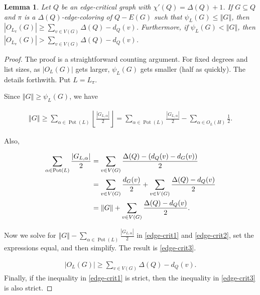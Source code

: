\documentclass[12pt,reqno]{amsart}
\theoremstyle{plain}
\newtheorem{lem}[thm]{Lemma}
\theoremstyle{definition}
\theoremstyle{remark}
\newcommand{\card}[1]{\left|#1\right|}
\newcommand{\size}[1]{\left\Vert#1\right\Vert}
\newcommand{\floor}[1]{\left\lfloor#1\right\rfloor}
\newcommand{\pot}{\operatorname{Pot}}
\begin{document}
\begin{lem}\label{LowPsiGivesManyOddColors}
Let $Q$ be an edge-critical graph with $\chi'(Q) = \Delta(Q) + 1$. If $G
\subseteq Q$ and $\pi$ is a $\Delta(Q)$-edge-coloring of $Q - E(G)$ such that
$\psi_L(G) \le \size{G}$, then $\card{O_{L_\pi}(G)} \ge \sum_{v \in V(G)}
\Delta(Q) - d_Q(v)$.  Furthermore, if $\psi_L(G) < \size{G}$, then
$\card{O_{L_\pi}(G)} > \sum_{v \in V(G)} \Delta(Q) - d_Q(v)$.
\end{lem}
\begin{proof}
The proof is a straightforward counting argument.  For fixed degrees and list
sizes, as $\card{O_L(G)}$ gets larger, $\psi_L(G)$ gets smaller (half as
quickly).  The details forthwith.  Put $L = L_\pi$.

Since $\size{G} \ge \psi_L(G)$, we have 

\begin{align}
\label{edge-crit1}
\size{G} \ge 
\sum_{\alpha \in \pot(L)} \floor{\frac{\card{G_{L, \alpha}}}{2}}  =
\sum_{\alpha \in \pot(L)} \frac{\card{G_{L, \alpha}}}{2} -  \sum_{\alpha \in
O_L(H)} \frac12 
.\end{align}

\noindent 
Also,

\begin{align}
\sum_{\alpha \in \pot(L)} \frac{\card{G_{L, \alpha}}}{2} 
&= \sum_{v \in V(G)} \frac{\Delta(Q) - (d_Q(v)-d_G(v))}{2} \notag\\
&= \sum_{v \in V(G)} \frac{d_G(v)}{2} + \sum_{v \in V(G)} \frac{\Delta(Q) - d_Q(v)}{2}\notag\\
&= \size{G} +  \sum_{v \in V(G)} \frac{\Delta(Q) - d_Q(v)}{2}.
\label{edge-crit2}
\end{align}

\noindent Now we solve for $\size{G}-
\sum_{\alpha \in \pot(L)} \frac{\card{G_{L, \alpha}}}{2}$ in 
\eqref{edge-crit1} and \eqref{edge-crit2}, set the expressions equal, and then
simplify.  The result is \eqref{edge-crit3}.

\begin{align}
\card{O_L(G)} \ge \sum_{v \in V(G)} \Delta(Q) - d_Q(v).
\label{edge-crit3}
\end{align}
Finally, if the inequality in \eqref{edge-crit1} is strict, then the inequality
in \eqref{edge-crit3} is also strict.
\end{proof}

\newpage
\end{document}
